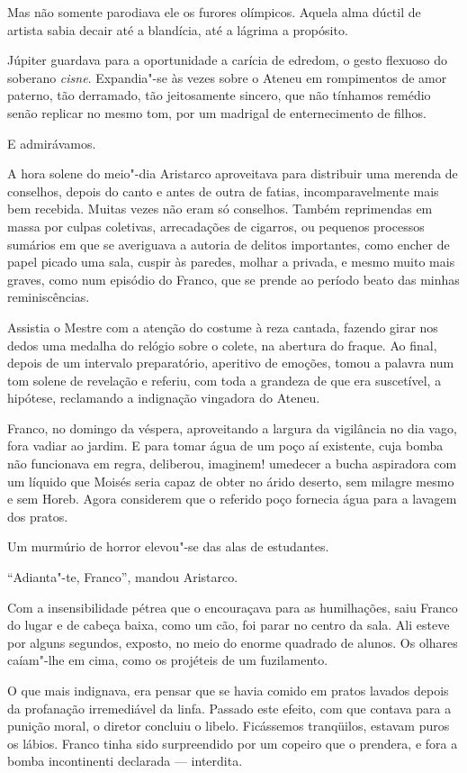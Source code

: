 Mas não somente parodiava ele os furores
olímpicos. Aquela alma dúctil de artista sabia decair até a blandícia,
até a lágrima a propósito. 

Júpiter guardava para a oportunidade a
carícia de edredom, o gesto flexuoso do soberano \textit{cisne}. Expandia"-se
às vezes sobre o Ateneu em rompimentos de amor paterno, tão derramado,
tão jeitosamente sincero, que não tínhamos remédio senão replicar no
mesmo tom, por um madrigal de enternecimento de filhos. 

E admirávamos.

A hora solene do meio"-dia Aristarco aproveitava para distribuir uma
merenda de conselhos, depois do canto e antes de outra de fatias,
incomparavelmente mais bem recebida. Muitas vezes não eram só
conselhos. Também reprimendas em massa por culpas coletivas,
arrecadações de cigarros, ou pequenos processos sumários em que se
averiguava a autoria de delitos importantes, como encher de papel
picado uma sala, cuspir às paredes, molhar a privada, e mesmo muito
mais graves, como num episódio do Franco, que se prende ao período
beato das minhas reminiscências. 

Assistia o Mestre com a atenção do
costume à reza cantada, fazendo girar nos dedos uma medalha do relógio
sobre o colete, na abertura do fraque. Ao final, depois de um intervalo
preparatório, aperitivo de emoções, tomou a palavra num tom solene de
revelação e referiu, com toda a grandeza de que era suscetível, a
hipótese, reclamando a indignação vingadora do Ateneu. 

Franco, no domingo da véspera, aproveitando a largura da vigilância no dia vago,
fora vadiar ao jardim. E para tomar água de um poço aí existente, cuja
bomba não funcionava em regra, deliberou, imaginem! umedecer a bucha
aspiradora com um líquido que Moisés seria capaz de obter no árido
deserto, sem milagre mesmo e sem Horeb. Agora considerem que o referido
poço fornecia água para a lavagem dos pratos. 

Um murmúrio de horror elevou"-se das alas de estudantes. 

``Adianta"-te, Franco'', mandou Aristarco. 

Com a insensibilidade pétrea que o encouraçava para as
humilhações, saiu Franco do lugar e de cabeça baixa, como um cão, foi
parar no centro da sala. Ali esteve por alguns segundos, exposto, no
meio do enorme quadrado de alunos. Os olhares caíam"-lhe em cima, como
os projéteis de um fuzilamento. 

O que mais indignava, era pensar que se
havia comido em pratos lavados depois da profanação irremediável da
linfa. Passado este efeito, com que contava para a punição moral, o
diretor concluiu o libelo. Ficássemos tranqüilos, estavam puros os lábios. Franco tinha
sido surpreendido por um copeiro que o prendera, e fora a bomba
incontinenti declarada --- interdita. 

